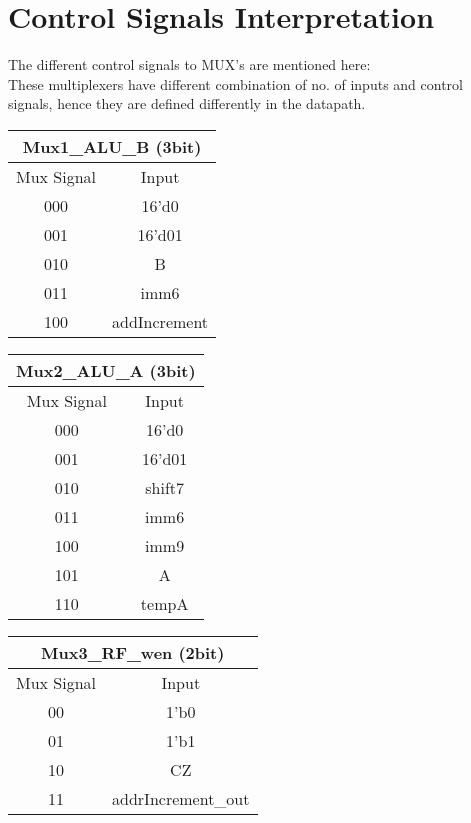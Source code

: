\documentclass[11pt,fleqn,oneside]{book} %
\begin{document}
\section{Control Signals Interpretation} 
The different control signals to MUX's are mentioned here: \\
These multiplexers have different combination of no. of inputs and control signals, hence they are defined differently in the datapath.
\vspace{1cm}
\begin{multicols}{3}
\begin{center}
 \begin{tabular}{||c|c||} 
 \hline
 \multicolumn{2}{|c|}{Mux1\_ALU\_B (3bit)} \\
 \hline
 Mux Signal & Input \\ [0.5ex] 
 \hline\hline
 000 & 16'd0  \\ 
 \hline
 001 & 16'd01  \\
 \hline
 010 & B  \\
 \hline
 011 & imm6  \\
 \hline
 100 & addIncrement \\ [1ex] 
 \hline
\end{tabular}
\end{center}


\begin{center}
 \begin{tabular}{||c|c||} 
 \hline
 \multicolumn{2}{|c|}{Mux2\_ALU\_A (3bit)} \\
 \hline
 Mux Signal & Input \\ [0.5ex] 
 \hline\hline
 000 & 16'd0  \\ 
 \hline
 001 & 16'd01  \\
 \hline
 010 & shift7  \\
 \hline
 011 & imm6  \\
 \hline
 100 & imm9 \\
 \hline
 101 & A  \\
 \hline
 110 & tempA  \\ [1ex]
 \hline
\end{tabular}
\end{center}


\begin{center}
 \begin{tabular}{||c|c||} 
 \hline
 \multicolumn{2}{|c|}{Mux3\_RF\_wen (2bit)} \\
 \hline
 Mux Signal & Input \\ [0.5ex] 
 \hline\hline
 00 & 1'b0  \\ 
 \hline
 01 & 1'b1  \\
 \hline
 10 & CZ  \\
 \hline
 11 & addrIncrement\_out  \\ [1ex] 
 \hline
\end{tabular}
\end{center}

\end{multicols}
\end{document}
